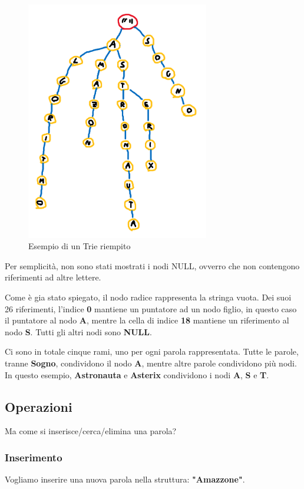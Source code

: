 \documentclass[a4paper, 12pt]{article}
\begin{document}
\begin{figure}[ht!]
    \centering
    \includegraphics[width=8cm]{Images/esempio trie riempitp.png}
    \caption{Esempio di un Trie riempito}
    \label{fig:my_label}
\end{figure}

Per semplicità, non sono stati mostrati i nodi NULL, ovverro che non contengono riferimenti ad altre lettere.

Come è gia stato spiegato, il nodo radice rappresenta la stringa vuota. Dei suoi 26 riferimenti, l'indice \textbf{0} mantiene un puntatore ad un nodo figlio, in questo caso il puntatore al nodo \textbf{A}, mentre la cella di indice \textbf{18} mantiene un riferimento al nodo \textbf{S}. Tutti gli altri nodi sono \textbf{NULL}.

Ci sono in totale cinque rami, uno per ogni parola rappresentata. Tutte le parole, tranne \textbf{Sogno}, condividono il nodo \textbf{A}, mentre altre parole condividono più nodi. In questo esempio, \textbf{Astronauta} e \textbf{Asterix} condividono i nodi \textbf{A}, \textbf{S} e \textbf{T}.

\subsection{Operazioni}
Ma come si inserisce/cerca/elimina una parola?
\subsubsection{Inserimento}
Vogliamo inserire una nuova parola nella struttura: \textbf{"Amazzone"}.
\end{document}
